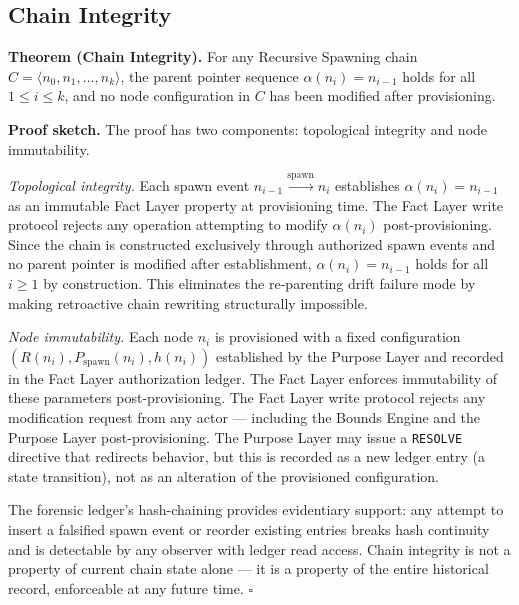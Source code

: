 \subsection{Chain Integrity}
\label{sec:rs-chain-integrity}

\noindent\textbf{Theorem (Chain Integrity).} For any Recursive Spawning chain $C = \langle n_0, n_1, \ldots, n_k \rangle$, the parent pointer sequence $\alpha(n_i) = n_{i-1}$ holds for all $1 \leq i \leq k$, and no node configuration in $C$ has been modified after provisioning.

\medskip
\noindent\textbf{Proof sketch.} The proof has two components: topological integrity and node immutability.

\medskip
\textit{Topological integrity.} Each spawn event $n_{i-1} \xrightarrow{\text{spawn}} n_i$ establishes $\alpha(n_i) = n_{i-1}$ as an immutable Fact Layer property at provisioning time. The Fact Layer write protocol rejects any operation attempting to modify $\alpha(n_i)$ post-provisioning. Since the chain is constructed exclusively through authorized spawn events and no parent pointer is modified after establishment, $\alpha(n_i) = n_{i-1}$ holds for all $i \geq 1$ by construction. This eliminates the re-parenting drift failure mode by making retroactive chain rewriting structurally impossible.

\medskip
\textit{Node immutability.} Each node $n_i$ is provisioned with a fixed configuration $(R(n_i), P_{\mathrm{spawn}}(n_i), h(n_i))$ established by the Purpose Layer and recorded in the Fact Layer authorization ledger. The Fact Layer enforces immutability of these parameters post-provisioning. The Fact Layer write protocol rejects any modification request from any actor — including the Bounds Engine and the Purpose Layer post-provisioning. The Purpose Layer may issue a \texttt{RESOLVE} directive that redirects behavior, but this is recorded as a new ledger entry (a state transition), not as an alteration of the provisioned configuration.

The forensic ledger's hash-chaining provides evidentiary support: any attempt to insert a falsified spawn event or reorder existing entries breaks hash continuity and is detectable by any observer with ledger read access. Chain integrity is not a property of current chain state alone — it is a property of the entire historical record, enforceable at any future time. $\square$

